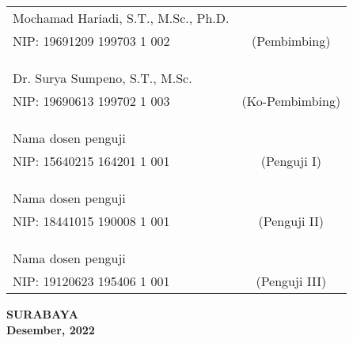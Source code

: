 \noindent
\begin{tabularx}{\textwidth}{X c}
  Mochamad Hariadi, S.T., M.Sc., Ph.D. &                 \\
  NIP: 19691209 199703 1 002           & (Pembimbing)    \\
                                       &                 \\
                                       &                 \\
                                       &                 \\
  Dr. Surya Sumpeno, S.T., M.Sc.       &                 \\
  NIP: 19690613 199702 1 003           & (Ko-Pembimbing) \\
                                       &                 \\
                                       &                 \\
                                       &                 \\
  Nama dosen penguji                   &                 \\
  NIP: 15640215 164201 1 001           & (Penguji I)     \\
                                       &                 \\
                                       &                 \\
                                       &                 \\
  Nama dosen penguji                   &                 \\
  NIP: 18441015 190008 1 001           & (Penguji II)    \\
                                       &                 \\
                                       &                 \\
                                       &                 \\
  Nama dosen penguji                   &                 \\
  NIP: 19120623 195406 1 001           & (Penguji III)   \\
\end{tabularx}
\endgroup

\vspace{4ex}

\begin{center}
  \textbf{SURABAYA} \\
  \textbf{Desember, 2022}
\end{center}
\endgroup
